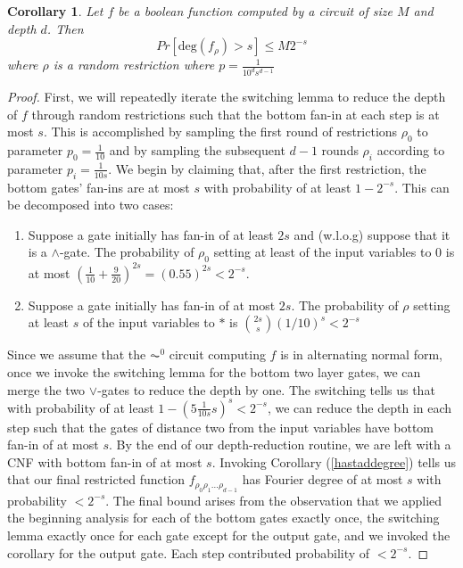 \documentclass{amsart}
\newtheorem{corollary}{Corollary}[theorem]
\theoremstyle{definition}
\theoremstyle{remark}
\numberwithin{equation}{section}
\theoremstyle{remark}
\begin{document}
\begin{corollary} \label{fouriertail}
  Let $f$ be a boolean function computed by a circuit of size $M$ and depth $d$. Then
  $$ Pr[\text{deg}(f_{\rho}) > s] \leq M2^{-s} $$
  where $\rho$ is a random restriction where $p = \frac{1}{10^ds^{d-1}}$
\end{corollary}
%
\begin{proof}
   First, we will repeatedly iterate the switching lemma to reduce the depth of $f$ through random restrictions such that the bottom fan-in at each step is at most $s$. This is accomplished by sampling the first round of restrictions $\rho_0$ to parameter $p_0 = \frac{1}{10}$ and by sampling the subsequent $d-1$ rounds $\rho_i$ according to parameter $p_i = \frac{1}{10s}$. We begin by claiming that, after the first restriction, the bottom gates' fan-ins are at most $s$ with probability of at least $1 - 2^{-s}$. This can be decomposed into two cases:
   \begin{enumerate}
     \item Suppose a gate initially has fan-in of at least $2s$ and (w.l.o.g) suppose that it is a $\wedge$-gate. The probability of $\rho_0$ setting at least of the input variables to $0$ is at most $(\frac{1}{10} + \frac{9}{20})^{2s} = (0.55)^{2s} < 2^{-s}$.
     \item Suppose a gate initially has fan-in of at most $2s$. The probability of $\rho$ setting at least $s$ of the input variables to $*$ is ${2s \choose s}(1/10)^s < 2^{-s}$
   \end{enumerate}
  Since we assume that the $\AC^0$ circuit computing $f$ is in alternating normal form, once we invoke the switching lemma for the bottom two layer gates, we can merge the two $\vee$-gates to reduce the depth by one. The switching tells us that with probability of at least $1 - (5\frac{1}{10s}s)^s < 2^{-s}$, we can reduce the depth in each step such that the gates of distance two from the input variables have bottom fan-in of at most $s$. By the end of our depth-reduction routine, we are left with a CNF with bottom fan-in of at most $s$. Invoking Corollary (\ref{hastaddegree}) tells us that our final restricted function $f_{\rho_0\rho_1...\rho_{d-1}}$ has Fourier degree of at most $s$ with probability $< 2^{-s}$. The final bound arises from the observation that we applied the beginning analysis for each of the bottom gates exactly once, the switching lemma exactly once for each gate except for the output gate, and we invoked the corollary for the output gate. Each step contributed probability of $< 2^{-s}$.
\end{proof}
\end{document}
